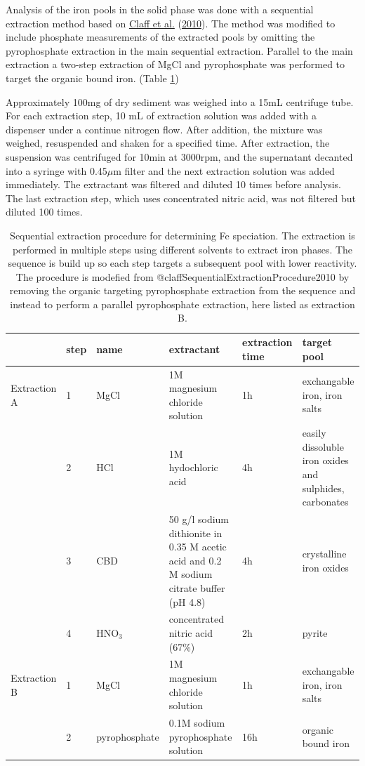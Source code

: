 \documentclass[a4paper,11pt]{article}
\begin{document}
Analysis of the iron pools in the solid phase was done with a sequential extraction method based on \protect\hyperlink{ref-claffSequentialExtractionProcedure2010}{Claff et al.} (\protect\hyperlink{ref-claffSequentialExtractionProcedure2010}{2010}). The method was modified to include phosphate measurements of the extracted pools by omitting the pyrophosphate extraction in the main sequential extraction. Parallel to the main extraction a two-step extraction of MgCl and pyrophosphate was performed to target the organic bound iron. (Table \ref{tab:seqextr})

Approximately 100mg of dry sediment was weighed into a 15mL centrifuge tube. For each extraction step, 10 mL of extraction solution was added with a dispenser under a continue nitrogen flow. After addition, the mixture was weighed, resuspended and shaken for a specified time. After extraction, the suspension was centrifuged for 10min at 3000rpm, and the supernatant decanted into a syringe with 0.45\(\mu\)m filter and the next extraction solution was added immediately. The extractant was filtered and diluted 10 times before analysis. The last extraction step, which uses concentrated nitric acid, was not filtered but diluted 100 times.
\begin{table}[ht]
 \centering
     {\footnotesize
        \begin{tabular}{m{} m{} | m{} m{} m{} m{}}
            \hline \hline
                  & step  & name & extractant & extraction time & target pool      \\
            \hline
                Extraction A   & 1 & MgCl & 1M magnesium chloride solution & 1h & exchangable iron, iron salts \\
                   & 2 & HCl & 1M hydochloric acid & 4h & easily dissoluble iron oxides and sulphides, carbonates\\
                   & 3 & CBD & 50 g/l sodium dithionite in 0.35 M acetic acid and 0.2 M sodium citrate buffer (pH 4.8)  & 4h & crystalline iron oxides \\
                   & 4 & HNO$_3$ & concentrated nitric acid (67\%)& 2h & pyrite\\
                   \hline
                    Extraction B   & 1 & MgCl & 1M magnesium chloride solution & 1h & exchangable iron, iron salts\\
                    & 2 & pyrophosphate & 0.1M sodium pyrophosphate solution & 16h & organic bound iron\\
            \hline \hline
        \end{tabular}}
    \caption{Sequential extraction procedure for determining Fe speciation. The extraction is performed in multiple steps using different solvents to extract iron phases. The sequence is build up so each step targets a subsequent pool with lower reactivity. The procedure is modefied from @claffSequentialExtractionProcedure2010 by removing the organic targeting pyrophosphate extraction from the sequence and instead to perform a parallel pyrophosphate extraction, here listed as extraction B.  }
    \label{tab:seqextr}
    \end{table}
\end{document}
